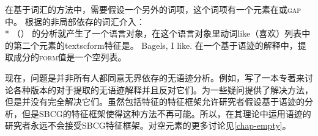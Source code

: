 在基于词汇的方法中，需要假设一个另外的词项，这个词项有一个元素在\slaschc 或\textsc{gap}中。
\ea
根据\citet[]{Sag2012a}的非局部依存的词汇介入：\\*
\z
（） 的分析就产生了一个语言对象，在这个语言对象里动词like（喜欢）\argstlc 列表中的第二个元素的textsc{form}特征是。
\ea
Bagels, I like.
\z
在一个基于语迹的解释中，提取成分的\textsc{form}值是一个空列表。

现在，问题是并非所有人都同意无界依存的无语迹分析。例如，\citet{LH2006a}写了一本专著来讨论各种版本的对于提取的无语迹解释并且反对它们。\citet{Chaves2009a}为一些疑问提供了解决方法，但是并没有完全解决它们。虽然包括\localfc 特征的特征框架允许研究者假设基于语迹的分析，但是SBCG的特征框架使得这种方法不再可能。所以，在其理论中运用语迹的研究者永远不会接受SBCG特征框架。对空元素的更多讨论见\ref{chap-empty}。

